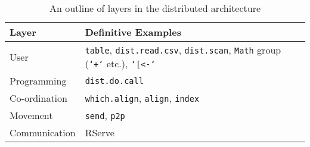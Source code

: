 \documentclass[10pt, a4paper]{article}
\begin{document}
\begin{table}
	\centering
	\begin{tabularx}{\textwidth}{ l X }
		\toprule
	Layer 		& Definitive Examples \\
	\midrule
	User 		& \texttt{table}, \texttt{dist.read.csv}, 
			  \texttt{dist.scan}, \texttt{Math} group (\texttt{`+`}
			  etc.), \texttt{`[<-`}\\
	Programming 	& \texttt{dist.do.call} \\
	Co-ordination 	& \texttt{which.align}, \texttt{align}, \texttt{index}\\
	Movement 	& \texttt{send}, \texttt{p2p}\\
	Communication 	& RServe\\
	\bottomrule
	\end{tabularx}
\caption{An outline of layers in the distributed architecture}
\label{tab:layers}
\end{table}
\end{document}
